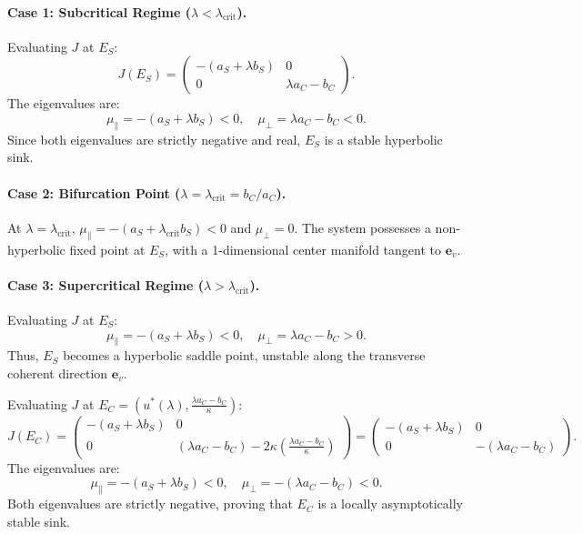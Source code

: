 \documentclass{article}
\theoremstyle{plain}
\theoremstyle{definition}
\begin{document}
\paragraph{Case 1: Subcritical Regime ($\lambda < \lambda_{\text{crit}}$).}
Evaluating $J$ at $E_S$:
\begin{equation}
    J(E_S) = \begin{pmatrix}
        -(a_S + \lambda b_S) & 0 \\
        0 & \lambda a_C - b_C
    \end{pmatrix}.
\end{equation}
The eigenvalues are:
\begin{equation}
    \mu_{\parallel} = -(a_S + \lambda b_S) < 0, \quad \mu_{\perp} = \lambda a_C - b_C < 0.
\end{equation}
Since both eigenvalues are strictly negative and real, $E_S$ is a stable hyperbolic sink.

\paragraph{Case 2: Bifurcation Point ($\lambda = \lambda_{\text{crit}} = b_C / a_C$).}
At $\lambda = \lambda_{\text{crit}}$, $\mu_{\parallel} = -(a_S + \lambda_{\text{crit}} b_S) < 0$ and $\mu_{\perp} = 0$. The system possesses a non-hyperbolic fixed point at $E_S$, with a 1-dimensional center manifold tangent to $\mathbf{e}_v$.

\paragraph{Case 3: Supercritical Regime ($\lambda > \lambda_{\text{crit}}$).}
Evaluating $J$ at $E_S$:
\begin{equation}
    \mu_{\parallel} = -(a_S + \lambda b_S) < 0, \quad \mu_{\perp} = \lambda a_C - b_C > 0.
\end{equation}
Thus, $E_S$ becomes a hyperbolic saddle point, unstable along the transverse coherent direction $\mathbf{e}_v$.

Evaluating $J$ at $E_C = \left( u^*(\lambda), \frac{\lambda a_C - b_C}{\kappa} \right)$:
\begin{equation}
    J(E_C) = \begin{pmatrix}
        -(a_S + \lambda b_S) & 0 \\
        0 & (\lambda a_C - b_C) - 2\kappa \left( \frac{\lambda a_C - b_C}{\kappa} \right)
    \end{pmatrix} = \begin{pmatrix}
        -(a_S + \lambda b_S) & 0 \\
        0 & -(\lambda a_C - b_C)
    \end{pmatrix}.
\end{equation}
The eigenvalues are:
\begin{equation}
    \mu_{\parallel} = -(a_S + \lambda b_S) < 0, \quad \mu_{\perp} = -(\lambda a_C - b_C) < 0.
\end{equation}
Both eigenvalues are strictly negative, proving that $E_C$ is a locally asymptotically stable sink.
\end{document}
